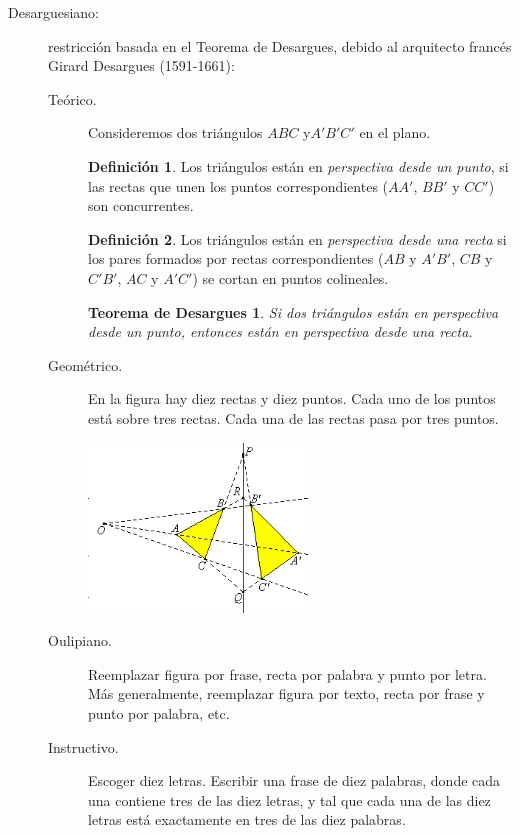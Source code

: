 \documentclass[12pt]{article}
\newtheorem*{TD}{Teorema de Desargues}
\theoremstyle{definition}
\newtheorem{defin}{Definición}
\begin{document}
\begin{description}
\item[Desarguesiano:] restricción basada en el Teorema de Desargues, debido al 
arquitecto francés Girard Desargues (1591-1661):

\begin{description}
 \item[Teórico.] Consideremos dos triángulos $ABC$ y$A'B'C'$ en el plano.
\begin{defin}
Los triángulos están en \textit{perspectiva desde un punto}, si las rectas que 
unen los puntos correspondientes ($AA'$, $BB'$ y $CC'$) son concurrentes.
\end{defin}

\begin{defin}
Los triángulos están en \textit{perspectiva desde una recta} si los pares 
formados por rectas correspondientes ($AB$ y $A'B'$, $CB$ y $C'B'$, $AC$ y 
$A'C'$) se cortan en puntos colineales.
\end{defin}

\begin{TD}
 Si dos triángulos están en perspectiva desde un punto, entonces están en 
perspectiva desde una recta.
\end{TD}

\item[Geométrico.] En la figura hay diez rectas y diez puntos. Cada uno de los 
puntos está sobre tres rectas. Cada una de las rectas pasa por tres puntos.

\begin{center}
 \includegraphics[height=4.5cm]{./desarg1.png}
\end{center}

\item[Oulipiano.] Reemplazar figura por frase, recta por palabra y punto por 
letra. Más generalmente, reemplazar figura por texto, recta por frase y punto 
por palabra, etc.

\item[Instructivo.] Escoger diez letras. Escribir una frase de diez palabras, 
donde cada una contiene tres de las diez letras, y tal que cada una de las diez 
letras está exactamente en tres de las diez palabras.
\end{description}
\end{description}
\end{document}

